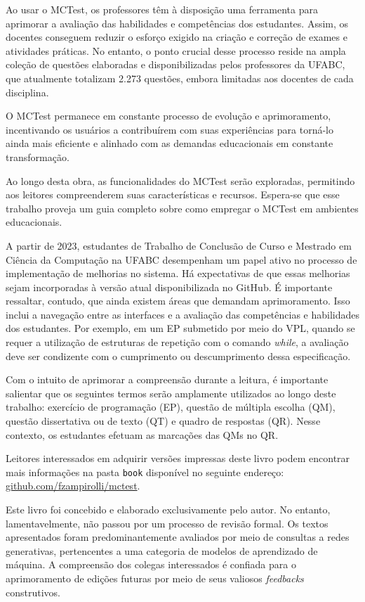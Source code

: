Ao usar o MCTest, os professores têm à disposição uma ferramenta para aprimorar a avaliação das habilidades e competências dos estudantes. Assim, os docentes conseguem reduzir o esforço exigido na criação e correção de exames e atividades práticas. No entanto, o ponto crucial desse processo reside na ampla coleção de questões elaboradas e disponibilizadas pelos professores da UFABC, que atualmente totalizam 2.273 questões, embora limitadas aos docentes de cada disciplina.

O MCTest permanece em constante processo de evolução e aprimoramento, incentivando os usuários a contribuírem com suas experiências para torná-lo ainda mais eficiente e alinhado com as demandas educacionais em constante transformação.

Ao longo desta obra, as funcionalidades do MCTest serão exploradas, permitindo aos leitores compreenderem suas características e recursos. Espera-se que esse trabalho proveja um guia completo sobre como empregar o MCTest em ambientes educacionais.

A partir de 2023, estudantes de Trabalho de Conclusão de Curso e Mestrado em Ciência da Computação na UFABC desempenham um papel ativo no processo de implementação de melhorias no sistema. Há expectativas de que essas melhorias sejam incorporadas à versão atual disponibilizada no GitHub. É importante ressaltar, contudo, que ainda existem áreas que demandam aprimoramento. Isso inclui a navegação entre as interfaces e a avaliação das competências e habilidades dos estudantes. Por exemplo, em um EP submetido por meio do VPL, quando se requer a utilização de estruturas de repetição com o comando \textit{while}, a avaliação deve ser condizente com o cumprimento ou descumprimento dessa especificação.

Com o intuito de aprimorar a compreensão durante a leitura, é importante salientar que os seguintes termos serão amplamente utilizados ao longo deste trabalho: exercício de programação (EP), questão de múltipla escolha (QM), questão dissertativa ou de texto (QT) e quadro de respostas (QR). Nesse contexto, os estudantes efetuam as marcações das QMs no QR.

Leitores interessados em adquirir versões impressas deste livro podem encontrar mais informações na pasta \verb|book| disponível no seguinte endereço:
\href{https://github.com/fzampirolli/mctest/tree/master/book/1ed-br}{github.com/fzampirolli/mctest}.

Este livro foi concebido e elaborado exclusivamente pelo autor. No entanto, lamentavelmente, não passou por um processo de revisão formal. Os textos apresentados foram predominantemente avaliados por meio de consultas a redes generativas, pertencentes a uma categoria de modelos de aprendizado de máquina. A compreensão dos colegas interessados é confiada para o aprimoramento de edições futuras por meio de seus valiosos \textit{feedbacks} construtivos.

